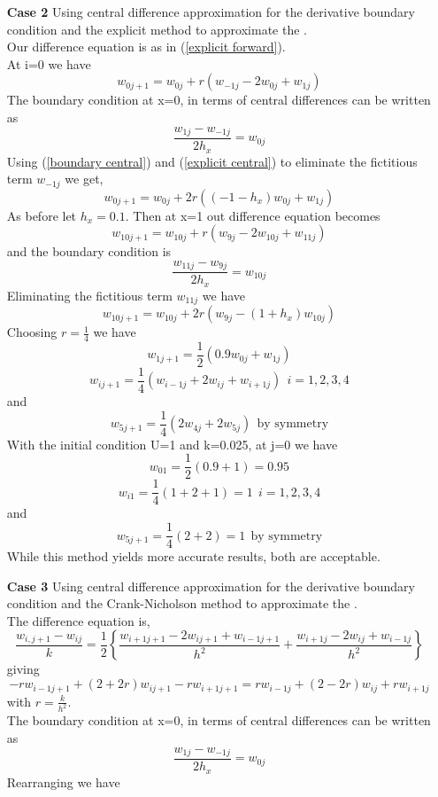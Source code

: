 \begin{example}
\begin{itemize}
\item[\textbf{Case 2}]
Using central difference approximation for the derivative boundary condition
and the explicit method to approximate the .\\
Our difference equation is as in (\ref{explicit forward}).\\
At i=0 we have
\begin{equation}
\label{explicit central}
w_{0j+1}=w_{0j} +r(w_{-1j}-2w_{0j}+w_{1j})
\end{equation}
The boundary condition at x=0, in terms of central differences can be written as
\begin{equation}
\label{boundary central}
\frac{w_{1j}-w_{-1j}}{2h_x}=w_{0j} 
\end{equation}
Using (\ref{boundary central}) and (\ref{explicit central}) to eliminate the fictitious term $w_{-1j}$ we get,
\[
w_{0j+1}=w_{0j} +2r((-1-h_x)w_{0j}+w_{1j})
\]
As before let $h_x=0.1$. Then at x=1 out difference equation becomes
\[w_{10j+1}=w_{10j} +r(w_{9j}-2w_{10j}+w_{11j})\]
and the boundary condition is 
\[
\frac{w_{11j}-w_{9j}}{2h_x}=w_{10j} \]
Eliminating the fictitious term $w_{11j}$ we have 
\[
w_{10j+1}=w_{10j}+2r(w_{9j}-(1+h_x)w_{10j}) \]
Choosing $r=\frac{1}{4}$ we have 
\[w_{1j+1}=\frac{1}{2}(0.9w_{0j}+w_{1j}) \]
\[w_{ij+1}=\frac{1}{4}(w_{i-1j}+2w_{ij}+w_{i+1j}) \ \ i=1,2,3,4 \]
and
\[w_{5j+1}=\frac{1}{4}(2w_{4j}+2w_{5j}) \ \ \mbox{by symmetry} \]
With the initial condition U=1 and k=0.025, at j=0 we have
\[w_{01}=\frac{1}{2}(0.9+1)=0.95 \]
\[w_{i1}=\frac{1}{4}(1+2+1)=1 \ \ i=1,2,3,4 \]
and
\[w_{5j+1}=\frac{1}{4}(2+2)=1 \ \ \mbox{by symmetry} \]
While this method yields more accurate results, both are acceptable.
\item[\textbf{Case 3}]
Using central difference approximation for the derivative boundary condition
and the Crank-Nicholson method to approximate the .\\
The difference equation is,
\[\frac{w_{i,j+1}-w_{ij}}{k}=\frac{1}{2}\left\{\frac{w_{i+1j+1}-2w_{ij+1}+w_{i-1j+1}}{h^2}+
\frac{w_{i+1j}-2w_{ij}+w_{i-1j}}{h^2}
\right\}
\]
giving
\begin{equation}
\label{2 crank central}
-rw_{i-1j+1}+(2+2r)w_{ij+1}-rw_{i+1j+1}
=
rw_{i-1j}+(2-2r)w_{ij}+rw_{i+1j}
\end{equation}
with $r=\frac{k}{h^2}$.\\
The boundary condition at x=0, in terms of central differences can be written as
\[
\frac{w_{1j}-w_{-1j}}{2h_x}=w_{0j} 
\]
Rearranging we have
\begin{equation}

\end{equation}
\end{itemize}
\end{example}
